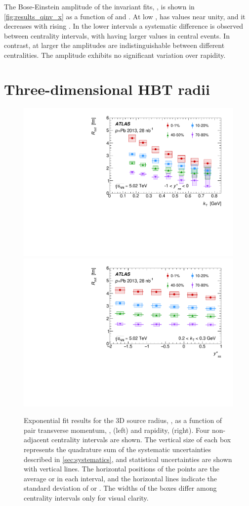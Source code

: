 The Bose-Einstein amplitude of the invariant fits, \linv, is shown in \cref{fig:results_qinv_x} as a function of \kt and \kys.
At low \kt, \linv has values near unity, and it decreases with rising \kt.
In the lower \kt intervals a systematic difference is observed between centrality intervals, with \linv having larger values in central events.
In contrast, at larger \kt the amplitudes are indistinguishable between different centralities.
The amplitude exhibits no significant variation over rapidity.

\FloatBarrier
\section{Three-dimensional HBT radii}
\label{sec:3d_results}

\begin{figure}[ht]
\centering
\includegraphics[width=.49\linewidth]{canqosl_Rout_vs_kt.pdf}
\includegraphics[width=.49\linewidth]{canqosl_Rout_vs_kys.pdf}
\caption{Exponential fit results for the 3D source radius, \Rout, as a function of pair transverse momentum, \kt, (left) and rapidity, \kys (right). Four non-adjacent centrality intervals are shown. The vertical size of each box represents the quadrature sum of the systematic uncertainties described in \cref{sec:systematics}, and statistical uncertainties are shown with vertical lines. The horizontal positions of the points are the average \kt or \kys in each interval, and the horizontal lines indicate the standard deviation of \kt or \kys. The widths of the boxes differ among centrality intervals only for visual clarity.}
\label{fig:results_Rout}
\end{figure}

